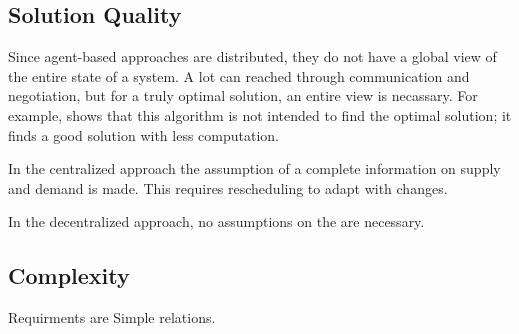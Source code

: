 \subsection{Solution Quality}
Since agent-based approaches are distributed, they do not have a global view of the entire state of a system. A lot can reached through communication and negotiation, but for a truly optimal solution, an entire view is necassary. For example,  \citep{palmer2003decentralized} shows that this algorithm is not intended to find the optimal solution; it finds a good solution with less computation. 

In the centralized approach the assumption of a complete information on supply and demand is made. This requires rescheduling to adapt with changes. 

In the decentralized approach, no assumptions on the are necessary. 


\subsection{Complexity}
Requirments are Simple relations. %



